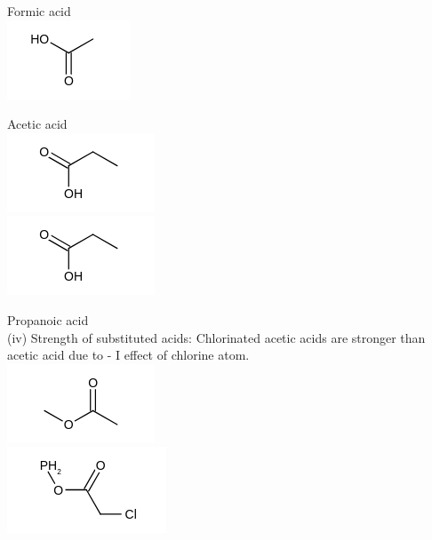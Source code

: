 \documentclass[10pt]{article}
\begin{document}
Formic acid\\
\includegraphics{smile-c5b7a786adfac9f0121f33703e6946a3b8793f89}

Acetic acid\\
\includegraphics{smile-f2a34f5feb813395dbef3bb3124182522807654d}\\
\includegraphics{smile-a139cd76ba4a1dafc5e45fe7c99030026a518fcc}

Propanoic acid\\
(iv) Strength of substituted acids: Chlorinated acetic acids are stronger than acetic acid due to - I effect of chlorine atom.\\
\includegraphics{smile-cb9789e5ea089f617e083f807147e206af0c0030}\\
\includegraphics{smile-e2b9e0831fdf654ee11025cff58856a64241ca54}
\end{document}

